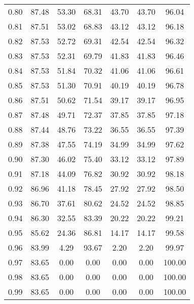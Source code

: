 \begin{tabular}{|c|c|c|c|c|c|c|}
      0.80 &     87.48 &     53.30 &      68.31 &   43.70 &      43.70 &         96.04 \\
      0.81 &     87.51 &     53.02 &      68.83 &   43.12 &      43.12 &         96.18 \\
      0.82 &     87.53 &     52.72 &      69.31 &   42.54 &      42.54 &         96.32 \\
      0.83 &     87.53 &     52.31 &      69.79 &   41.83 &      41.83 &         96.46 \\
      0.84 &     87.53 &     51.84 &      70.32 &   41.06 &      41.06 &         96.61 \\
      0.85 &     87.53 &     51.30 &      70.91 &   40.19 &      40.19 &         96.78 \\
      0.86 &     87.51 &     50.62 &      71.54 &   39.17 &      39.17 &         96.95 \\
      0.87 &     87.48 &     49.71 &      72.37 &   37.85 &      37.85 &         97.18 \\
      0.88 &     87.44 &     48.76 &      73.22 &   36.55 &      36.55 &         97.39 \\
      0.89 &     87.38 &     47.55 &      74.19 &   34.99 &      34.99 &         97.62 \\
      0.90 &     87.30 &     46.02 &      75.40 &   33.12 &      33.12 &         97.89 \\
      0.91 &     87.18 &     44.09 &      76.82 &   30.92 &      30.92 &         98.18 \\
      0.92 &     86.96 &     41.18 &      78.45 &   27.92 &      27.92 &         98.50 \\
      0.93 &     86.70 &     37.61 &      80.62 &   24.52 &      24.52 &         98.85 \\
      0.94 &     86.30 &     32.55 &      83.39 &   20.22 &      20.22 &         99.21 \\
      0.95 &     85.62 &     24.36 &      86.81 &   14.17 &      14.17 &         99.58 \\
      0.96 &     83.99 &      4.29 &      93.67 &    2.20 &       2.20 &         99.97 \\
      0.97 &     83.65 &      0.00 &       0.00 &    0.00 &       0.00 &        100.00 \\
      0.98 &     83.65 &      0.00 &       0.00 &    0.00 &       0.00 &        100.00 \\
      0.99 &     83.65 &      0.00 &       0.00 &    0.00 &       0.00 &        100.00 \\
\bottomrule
\end{tabular}
